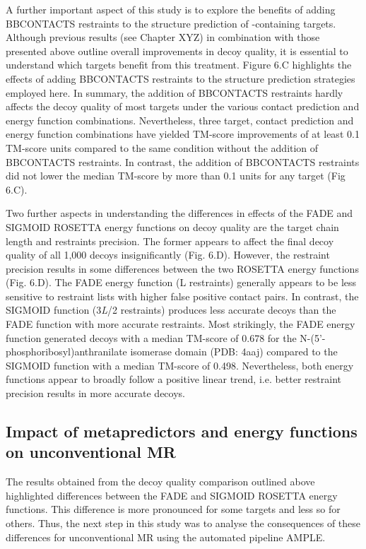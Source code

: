 A further important aspect of this study is to explore the benefits of adding BBCONTACTS restraints to the structure prediction of \textbeta-containing targets. Although previous results (see Chapter XYZ) in combination with those presented above outline overall improvements in decoy quality, it is essential to understand which targets benefit from this treatment. Figure 6.C highlights the effects of adding BBCONTACTS restraints to the structure prediction strategies employed here. In summary, the addition of BBCONTACTS restraints hardly affects the decoy quality of most targets under the various contact prediction and energy function combinations. Nevertheless, three target, contact prediction and energy function combinations have yielded TM-score improvements of at least 0.1 TM-score units compared to the same condition without the addition of BBCONTACTS restraints. In contrast, the addition of BBCONTACTS restraints did not lower the median TM-score by more than 0.1 units for any target (Fig 6.C).

Two further aspects in understanding the differences in effects of the FADE and SIGMOID ROSETTA energy functions on decoy quality are the target chain length and restraints precision. The former appears to affect the final decoy quality of all 1,000 decoys insignificantly (Fig. 6.D). However, the restraint precision results in some differences between the two ROSETTA energy functions (Fig. 6.D). The FADE energy function (L restraints) generally appears to be less sensitive to restraint lists with higher false positive contact pairs.  In contrast, the SIGMOID function  (3\textit{L}/2 restraints) produces less accurate decoys than the FADE function with more accurate restraints. Most strikingly, the FADE energy function generated decoys with a median TM-score of 0.678 for the N-(5'-phosphoribosyl)anthranilate isomerase domain (PDB: 4aaj) compared to the SIGMOID function with a median TM-score of 0.498. Nevertheless, both energy functions appear to broadly follow a positive linear trend, i.e. better restraint precision results in more accurate decoys.

\subsection{Impact of metapredictors and energy functions on unconventional MR}
The results obtained from the decoy quality comparison outlined above highlighted differences between the FADE and SIGMOID ROSETTA energy functions. This difference is more pronounced for some targets and less so for others. Thus, the next step in this study was to analyse the consequences  of these differences for unconventional MR using the automated pipeline AMPLE.

